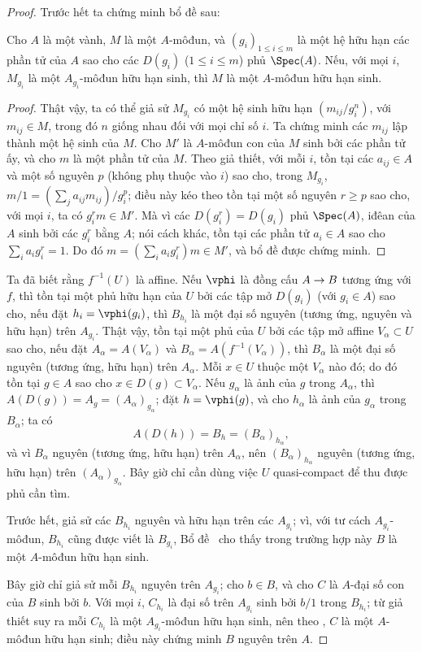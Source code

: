 \documentclass[oneside,10pt]{amsart}
\makeatletter
\renewcommand{\leq}{\leqslant}
\renewcommand{\geq}{\geqslant}
\newcommand{\ega@arrow}[2]{\mathchoice{#1}{#2}{#2}{#2}}
\renewcommand{\to}{\ega@arrow{\longrightarrow}{\rightarrow}}
\let\EGAOriginalLabel\label
\renewcommand{\label}[1]{\phantomsection\EGAOriginalLabel{#1}}
\makeatother
\begin{document}
\begin{proof}
Trước hết ta chứng minh bổ đề sau:

  \begin{lemma}[6.1.4.1]
  \label{II.6.1.4.1}
  Cho $A$ là một vành, $M$ là một $A$-môđun, và $(g_i)_{1\leq i\leq m}$ là một hệ hữu hạn các phần tử của $A$ sao cho các $D(g_i)$ ($1\leq i\leq m$) phủ $\Spec(A)$.
  Nếu, với mọi $i$, $M_{g_i}$ là một $A_{g_i}$-môđun hữu hạn sinh, thì $M$ là một $A$-môđun hữu hạn sinh.
  \end{lemma}

  \begin{proof}
  Thật vậy, ta có thể giả sử $M_{g_i}$ có một hệ sinh hữu hạn $(m_{ij}/g_i^n)$, với $m_{ij}\in M$, trong đó $n$ giống nhau đối với mọi chỉ số $i$.
  Ta chứng minh các $m_{ij}$ lập thành một hệ sinh của $M$.
  Cho $M'$ là $A$-môđun con của $M$ sinh bởi các phần tử ấy, và cho $m$ là một phần tử của $M$.
  Theo giả thiết, với mỗi $i$, tồn tại các $a_{ij}\in A$ và một số nguyên $p$ (không phụ thuộc vào $i$) sao cho, trong $M_{g_i}$, $m/1=(\sum_j a_{ij}m_{ij})/g_i^p$;
  điều này kéo theo tồn tại một số nguyên $r\geq p$ sao cho, với mọi $i$, ta có $g_i^rm\in M'$.
  Mà vì các $D(g_i^r)=D(g_i)$ phủ $\Spec(A)$, iđêan của $A$ sinh bởi các $g_i^r$ bằng $A$; nói cách khác, tồn tại các phần tử $a_i\in A$ sao cho $\sum_i a_ig_i^r=1$.
  Do đó $m=(\sum_i a_i g_i^r)m\in M'$, và bổ đề được chứng minh.
  \end{proof}

Ta đã biết  rằng $f^{-1}(U)$ là affine.
Nếu $\vphi$ là đồng cấu $A\to B$ tương ứng với $f$, thì tồn tại một phủ hữu hạn của $U$ bởi các tập mở $D(g_i)$ (với $g_i\in A$) sao cho, nếu đặt $h_i=\vphi(g_i)$, thì $B_{h_i}$ là một đại số nguyên (tương ứng, nguyên và hữu hạn) trên $A_{g_i}$.
Thật vậy, tồn tại một phủ của $U$ bởi các tập mở affine $V_\alpha\subset U$ sao cho, nếu đặt $A_\alpha=A(V_\alpha)$ và $B_\alpha=A(f^{-1}(V_\alpha))$, thì $B_\alpha$ là một đại số nguyên (tương ứng, hữu hạn) trên $A_\alpha$.
Mỗi $x\in U$ thuộc một $V_\alpha$ nào đó; do đó tồn tại $g\in A$ sao cho $x\in D(g)\subset V_\alpha$.
Nếu $g_\alpha$ là ảnh của $g$ trong $A_\alpha$, thì $A(D(g))=A_g=(A_\alpha)_{g_\alpha}$;
đặt $h=\vphi(g)$, và cho $h_\alpha$ là ảnh của $g_\alpha$ trong $B_\alpha$;
ta có
\[
  A(D(h))=B_h=(B_\alpha)_{h_\alpha},
\]
và vì $B_\alpha$ nguyên (tương ứng, hữu hạn) trên $A_\alpha$, nên $(B_\alpha)_{h_\alpha}$ nguyên (tương ứng, hữu hạn) trên $(A_\alpha)_{g_\alpha}$.
Bây giờ chỉ cần dùng việc $U$ quasi-compact để thu được phủ cần tìm.

Trước hết, giả sử các $B_{h_i}$ nguyên và hữu hạn trên các $A_{g_i}$;
vì, với tư cách $A_{g_i}$-môđun, $B_{h_i}$ cũng được viết là $B_{g_i}$, Bổ đề~ cho thấy trong trường hợp này $B$ là một $A$-môđun hữu hạn sinh.

Bây giờ chỉ giả sử mỗi $B_{h_i}$ nguyên trên $A_{g_i}$;
cho $b\in B$, và cho $C$ là $A$-đại số con của $B$ sinh bởi $b$.
Với mọi $i$, $C_{h_i}$ là đại số trên $A_{g_i}$ sinh bởi $b/1$ trong $B_{h_i}$;
từ giả thiết suy ra mỗi $C_{h_i}$ là một $A_{g_i}$-môđun hữu hạn sinh, nên theo , $C$ là một $A$-môđun hữu hạn sinh; điều này chứng minh $B$ nguyên trên $A$.
\end{proof}
\end{document}

